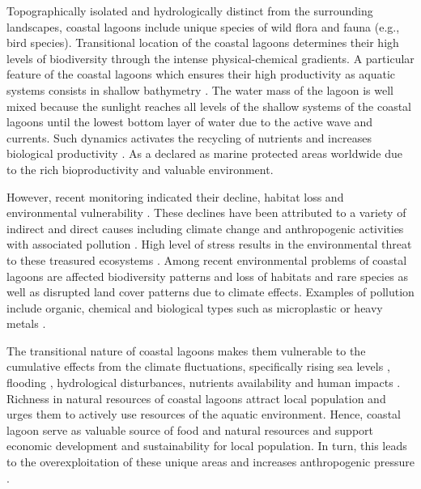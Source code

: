 \documentclass[jmse,article,submit,pdftex,moreauthors]{Definitions/mdpi}
\begin{document}
Topographically isolated and hydrologically distinct from the surrounding landscapes, coastal lagoons include unique species of wild flora and fauna (e.g., bird species). Transitional location of the coastal lagoons determines their high levels of biodiversity through the intense physical-chemical gradients. A particular feature of the coastal lagoons which ensures their high productivity as aquatic systems consists in shallow bathymetry \cite{PEREZRUZAFA2024171264}. The water mass of the lagoon is well mixed because the sunlight reaches all levels of the shallow systems of the coastal lagoons until the lowest bottom layer of water due to the active wave and currents. Such dynamics activates the recycling of nutrients and increases biological productivity \cite{Kennish2016}. As a  declared as marine protected areas worldwide due to the rich bioproductivity and valuable environment. 

However, recent monitoring indicated their decline, habitat loss and environmental vulnerability \cite{BASTOS2023102144,SUWANDHAHANNADI2024107069,MOHAPATRA2023163109}. These declines have been attributed to a variety of indirect and direct causes including climate change \cite{SIMANTIRIS2023108231} and anthropogenic activities with associated pollution \cite{GHANDOURAH2023102982}. High level of stress results in the environmental threat to these treasured ecosystems \cite{Davis}. Among recent environmental problems of coastal lagoons are affected biodiversity patterns and loss of habitats and rare species \cite{Kumari2022} as well as disrupted land cover patterns due to climate effects. Examples of pollution include organic, chemical and biological types such as microplastic \cite{GARCESORDONEZ2022120366,BRUSCHI2023110596} or heavy metals \cite{Tripathi2022}. 

The transitional nature of coastal lagoons makes them vulnerable to the cumulative effects from the climate fluctuations, specifically rising sea levels \cite{CARRASCO2016356}, flooding \cite{INACIO2023100491}, hydrological disturbances, nutrients availability \cite{LUNARDINI2000135} and human impacts \cite{Luglie}. Richness in natural resources of coastal lagoons attract local population and urges them to actively use resources of the aquatic environment. Hence, coastal lagoon serve as valuable source of food and natural resources and support economic development and sustainability for local population. In turn, this leads to the overexploitation of these unique areas and increases anthropogenic pressure \cite{PAULY1994377}. 
\end{document}
